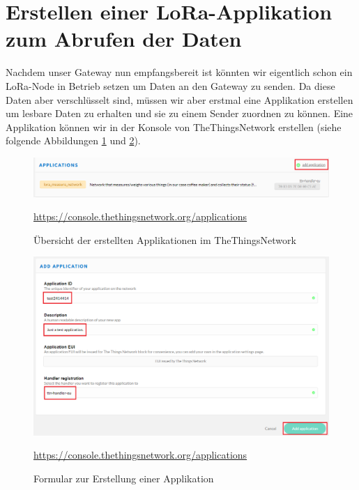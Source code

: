 \section{Erstellen einer LoRa-Applikation zum Abrufen der Daten}
Nachdem unser Gateway nun empfangsbereit ist könnten wir eigentlich schon ein LoRa-Node in Betrieb setzen um Daten an den Gateway zu senden.
Da diese Daten aber verschlüsselt sind, müssen wir aber erstmal eine Applikation erstellen um lesbare Daten zu erhalten und sie zu einem Sender zuordnen zu können.
Eine Applikation können wir in der Konsole von TheThingsNetwork erstellen (siehe folgende Abbildungen \ref{fig:lora-2} und \ref{fig:lora-3}).
\begin{figure}[H]
    \center
    \includegraphics[width=16cm]{Bilder/lora-2.png}\\
    \caption{Übersicht der erstellten Applikationen im TheThingsNetwork}
    \begin{center} \quelle\url{https://console.thethingsnetwork.org/applications} \end{center}
    \label{fig:lora-2}
\end{figure}
\begin{figure}[H]
    \center
    \includegraphics[width=16cm]{Bilder/lora-3.png}\\
    \caption{Formular zur Erstellung einer Applikation}
    \begin{center} \quelle\url{https://console.thethingsnetwork.org/applications} \end{center}
    \label{fig:lora-3}
\end{figure}
\newpage
